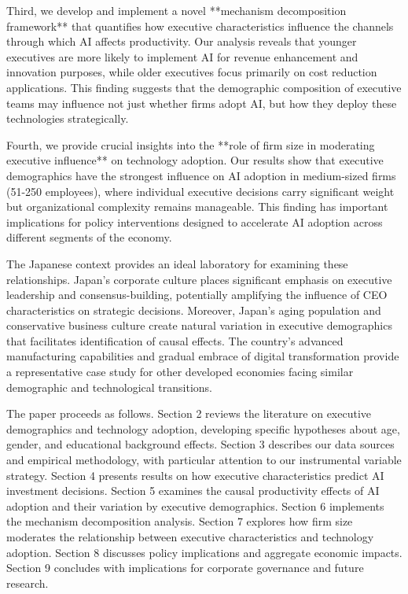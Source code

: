 \documentclass[12pt, a4paper]{article}
\begin{document}
Third, we develop and implement a novel **mechanism decomposition framework** that quantifies how executive characteristics influence the channels through which AI affects productivity. Our analysis reveals that younger executives are more likely to implement AI for revenue enhancement and innovation purposes, while older executives focus primarily on cost reduction applications. This finding suggests that the demographic composition of executive teams may influence not just whether firms adopt AI, but how they deploy these technologies strategically.

Fourth, we provide crucial insights into the **role of firm size in moderating executive influence** on technology adoption. Our results show that executive demographics have the strongest influence on AI adoption in medium-sized firms (51-250 employees), where individual executive decisions carry significant weight but organizational complexity remains manageable. This finding has important implications for policy interventions designed to accelerate AI adoption across different segments of the economy.

The Japanese context provides an ideal laboratory for examining these relationships. Japan's corporate culture places significant emphasis on executive leadership and consensus-building, potentially amplifying the influence of CEO characteristics on strategic decisions. Moreover, Japan's aging population and conservative business culture create natural variation in executive demographics that facilitates identification of causal effects. The country's advanced manufacturing capabilities and gradual embrace of digital transformation provide a representative case study for other developed economies facing similar demographic and technological transitions.

The paper proceeds as follows. Section 2 reviews the literature on executive demographics and technology adoption, developing specific hypotheses about age, gender, and educational background effects. Section 3 describes our data sources and empirical methodology, with particular attention to our instrumental variable strategy. Section 4 presents results on how executive characteristics predict AI investment decisions. Section 5 examines the causal productivity effects of AI adoption and their variation by executive demographics. Section 6 implements the mechanism decomposition analysis. Section 7 explores how firm size moderates the relationship between executive characteristics and technology adoption. Section 8 discusses policy implications and aggregate economic impacts. Section 9 concludes with implications for corporate governance and future research.
\end{document}

